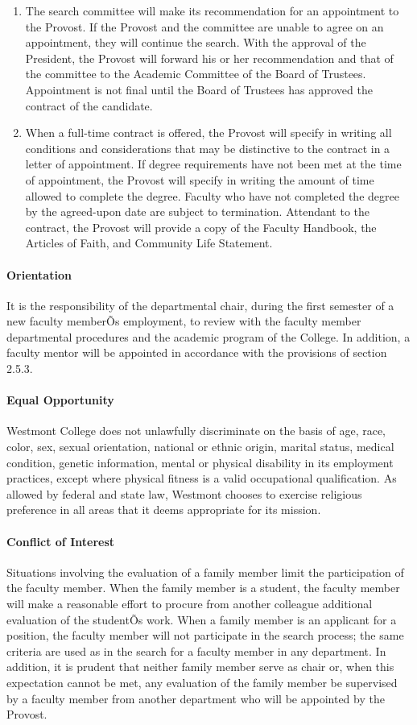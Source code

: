 \documentclass[letterpaper, 11pt]{article}
\begin{document}
				\begin{enumerate}[label=\alph*)]
					\item{The search committee will make its recommendation for an appointment to the Provost.  If the Provost and the committee are unable to agree on an appointment, they will continue the search.  With the approval of the President, the Provost will forward his or her recommendation and that of the committee to the Academic Committee of the Board of Trustees.  Appointment is not final until the Board of Trustees has approved the contract of the candidate.}
					\item{When a full-time contract is offered, the Provost will specify in writing all conditions and considerations that may be distinctive to the contract in a letter of appointment.  If degree requirements have not been met at the time of appointment, the Provost will specify in writing the amount of time allowed to complete the degree.  Faculty who have not completed the degree by the agreed-upon date are subject to termination.  Attendant to the contract, the Provost will provide a copy of the Faculty Handbook, the Articles of Faith, and Community Life Statement.}
				\end{enumerate}
			\paragraph{Orientation}
				It is the responsibility of the departmental chair, during the first semester of a new faculty memberÕs employment, to review with the faculty member departmental procedures and the academic program of the College.  In addition, a faculty mentor will be appointed in accordance with the provisions of section 2.5.3.
			\paragraph{Equal Opportunity}
				Westmont College does not unlawfully discriminate on the basis of age, race, color, sex, sexual orientation, national or ethnic origin, marital status, medical condition, genetic information, mental or physical disability in its employment practices, except where physical fitness is a valid occupational qualification. As allowed by federal and state law, Westmont chooses to exercise religious preference in all areas that it deems appropriate for its mission.
			\paragraph{Conflict of Interest}
				Situations involving the evaluation of a family member limit the participation of the faculty member.  When the family member is a student, the faculty member will make a reasonable effort to procure from another colleague additional evaluation of the studentÕs work.  When a family member is an applicant for a position, the faculty member will not participate in the search process; the same criteria are used as in the search for a faculty member in any department.  In addition, it is prudent that neither family member serve as chair or, when this expectation cannot be met, any evaluation of the family member be supervised by a faculty member from another department who will be appointed by the Provost.
\end{document}
